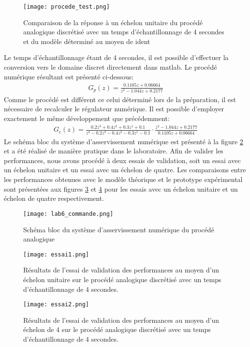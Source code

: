 \begin{figure}[htbp]
\centering
\texttt{[image: procede\_test.png]}
\caption{Comparaison de la réponse à un échelon unitaire du procédé analogique discrétisé avec un temps d'échantillonnage de 4 secondes et du modèle déterminé au moyen de ident }
\label{fig5}
\end{figure}

Le temps d'échantillonnage étant de 4 secondes, il est possible d'effectuer la conversion vers le domaine discret directement dans matlab. Le procédé numérique résultant est présenté ci-dessous:
\begin{gather}
G_p(z) = \frac{0.1105z + 0.06664}{z^2 -1.044z + 0.2177}
\end{gather}
Comme le procédé est différent ce celui déterminé lors de la préparation, il est nécessaire de recalculer le régulateur numérique. Il est possible d'employer exactement le même développement que précédemment:
\begin{gather}
G_c(z) = \frac{0.2z^{3} + 0.4z^{2} + 0.3z^{1} + 0.1}{z^4 - 0.2z^{3} - 0.4z^{2} - 0.3z^{1} - 0.1}\cdot \frac{z^2 -1.044z + 0.2177}{0.1105z + 0.06664}
\end{gather}
Le schéma bloc du système d'asservissement numérique est présenté à la figure \ref{fig2} et a été réalisé de manière pratique dans le laboratoire. Afin de valider les performances, nous avons procédé à deux essais de validation, soit un essai avec un échelon unitaire et un essai avec un échelon de quatre. Les comparaisons entre les performances obtenues avec le modèle théorique et le prototype expérimental sont présentées aux figures \ref{fig3} et \ref{fig4} pour les essais avec un échelon unitaire et un échelon de quatre respectivement. 



\begin{figure}[htbp]
\centering
\texttt{[image: lab6\_commande.png]}
\caption{Schéma bloc du système d'asservissement numérique du procédé analogique}
\label{fig2}
\end{figure}

\begin{figure}[htbp]
\centering
\texttt{[image: essai1.png]}
\caption{Résultats de l'essai de validation des performances au moyen d'un échelon unitaire sur le procédé analogique discrétisé avec un temps d'échantillonnage de 4 secondes.}
\label{fig3}
\end{figure}

\begin{figure}[htbp]
\centering
\texttt{[image: essai2.png]}
\caption{Résultats de l'essai de validation des performances au moyen d'un échelon de 4 sur le procédé analogique discrétisé avec un temps d'échantillonnage de 4 secondes.}
\label{fig4}
\end{figure}
\clearpage

